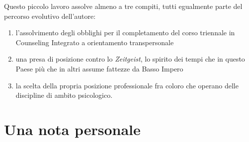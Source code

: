 \nocite{Nanetti2003}
\nocite{Tufte2001}
\nocite{TecnicheCostruttiviste}
\nocite{fisicaefil}
\nocite{hagakure}
\nocite{blackswan}
\nocite{attili2004}
\nocite{giochi}
\nocite{carkhuff}
\nocite{gestalt}
\nocite{goleman}
\nocite{costellazioni}
\nocite{voice}
\nocite{Nanetti2007}
\nocite{May1991}
\nocite{CounselingNarrativo}
\nocite{morineau2003}
\nocite{Nanetti2006}
\nocite{Nanetti2006-2}
\nocite{cambiamento}
\nocite{momenti}
\nocite{assertivita}
\nocite{gruppo}
\nocite{potere}
\nocite{intepersonale}
\nocite{stili}
\nocite{watzlawick}




Questo piccolo lavoro assolve almeno a tre compiti, tutti egualmente parte del percorso evolutivo dell'autore:
\begin{enumerate}
\item  l'assolvimento degli obblighi per il completamento del corso triennale in Counseling Integrato a orientamento transpersonale
\item una presa di posizione contro lo \emph{Zeitgeist}, lo spirito dei tempi che in questo Paese più che in altri assume fattezze da Basso Impero
\item la scelta della propria posizione professionale fra coloro che operano delle discipline di ambito psicologico.
\end{enumerate}

\section{Una nota personale}

